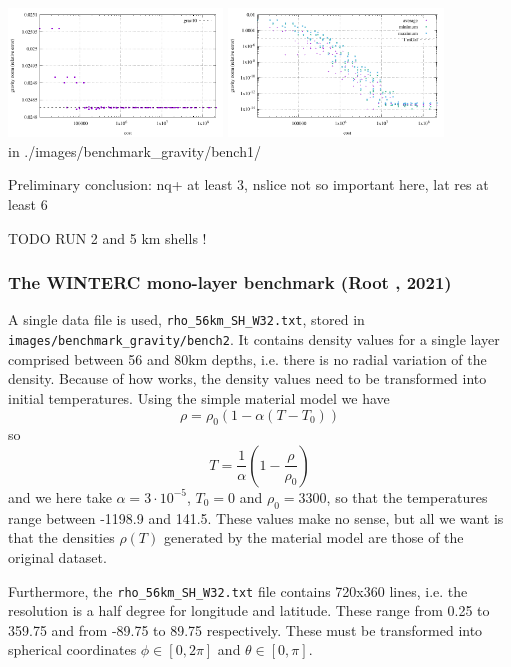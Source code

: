 \begin{center}
\includegraphics[width=5.7cm]{./images/benchmark_gravity/bench1/grav_cost}
\includegraphics[width=5.7cm]{./images/benchmark_gravity/bench1/grav_cost_error}\\
{\tiny {\color{gray} in ./images/benchmark\_gravity/bench1/}}
\end{center}

Preliminary conclusion: nq+ at least 3, nslice not so important here, lat res at least 6


TODO RUN 2 and 5 km shells !


\newpage
\subsubsection{The WINTERC mono-layer benchmark (Root \etal, 2021)}

A single data file is used,  {\tt rho\_56km\_SH\_W32.txt}, 
stored in {\tt images/benchmark\_gravity/bench2}. 
It contains density values for a single layer comprised between 56 and 80km depths, 
i.e. there is no radial variation of the density. 
Because of how \aspect{} works, the density values need to be transformed into 
initial temperatures. Using the simple material model we have
\[
\rho = \rho_0 (1-\alpha(T-T_0))
\]
so 
\[
T= \frac{1}{\alpha} \left(1 - \frac{\rho}{\rho_0} \right)
\]
and we here take $\alpha = 3\cdot 10^{-5}$, $T_0=0$ and $\rho_0=3300$, so that 
the temperatures range between -1198.9 and  141.5. These values make no sense, 
but all we want is that the densities $\rho(T)$ generated by the material model 
are those of the original dataset. 

Furthermore, the {\tt rho\_56km\_SH\_W32.txt} file contains 720x360 lines, i.e. 
the resolution is a half degree for longitude and latitude. These range from 0.25
to 359.75 and from -89.75 to 89.75 respectively. These must be transformed into 
spherical coordinates $\phi\in[0,2\pi]$ and $\theta \in[0,\pi]$.

